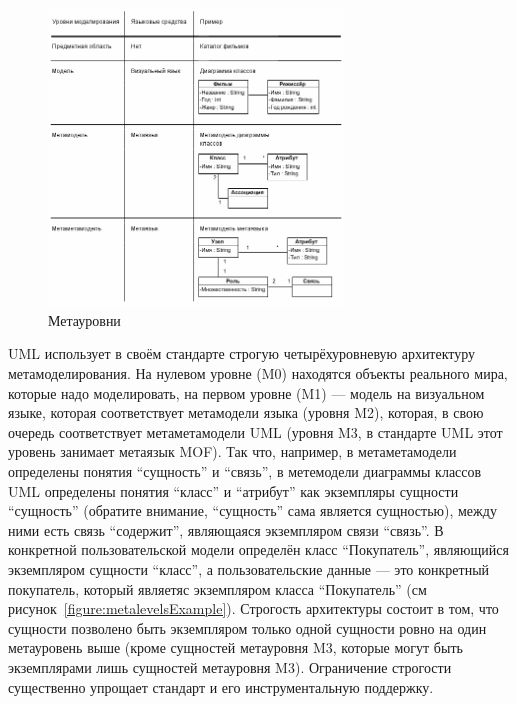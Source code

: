 \documentclass[a5paper]{article}
\begin{document}
\begin{figure}
	\begin{center}
		\includegraphics[width=0.7\textwidth]{metalevels.png}
	\end{center}
	\caption{Метауровни}
	\label{figure:metalevels}
\end{figure}

UML использует в своём стандарте строгую четырёхуровневую архитектуру метамоделирования. На нулевом уровне (M0) находятся объекты реального мира, которые надо моделировать, на первом уровне (M1) --- модель на визуальном языке, которая соответствует метамодели языка (уровня M2), которая, в свою очередь соответствует метаметамодели UML (уровня M3, в стандарте UML этот уровень занимает метаязык MOF). Так что, например, в метаметамодели определены понятия ``сущность'' и ``связь'', в метемодели диаграммы классов UML определены понятия ``класс'' и ``атрибут'' как экземпляры сущности ``сущность'' (обратите внимание, ``сущность'' сама является сущностью), между ними есть связь ``содержит'', являющаяся экземпляром связи ``связь''. В конкретной пользовательской модели определён класс ``Покупатель'', являющийся экземпляром сущности ``класс'', а пользовательские данные --- это конкретный покупатель, который являетяс экземпляром класса ``Покупатель'' (см рисунок~\ref{figure:metalevelsExample}). Строгость архитектуры состоит в том, что сущности позволено быть экземпляром только одной сущности ровно на один метауровень выше (кроме сущностей метауровня M3, которые могут быть экземплярами лишь сущностей метауровня M3). Ограничение строгости существенно упрощает стандарт и его инструментальную поддержку.
\end{document}
